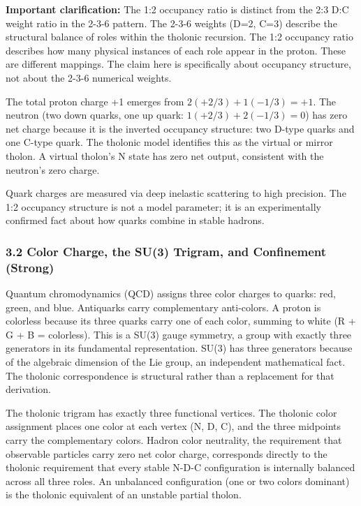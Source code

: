 \documentclass[
  11pt,
  letterpaper,
]{article}
\begin{document}
\textbf{Important clarification:} The 1:2 occupancy ratio is distinct
from the 2:3 D:C weight ratio in the 2-3-6 pattern. The 2-3-6 weights
(D=2, C=3) describe the structural balance of roles within the tholonic
recursion. The 1:2 occupancy ratio describes how many physical instances
of each role appear in the proton. These are different mappings. The
claim here is specifically about occupancy structure, not about the
2-3-6 numerical weights.

The total proton charge +1 emerges from \(2(+2/3) + 1(-1/3) = +1\). The
neutron (two down quarks, one up quark: \(1(+2/3) + 2(-1/3) = 0\)) has
zero net charge because it is the inverted occupancy structure: two
D-type quarks and one C-type quark. The tholonic model identifies this
as the virtual or mirror tholon. A virtual tholon's N state has zero net
output, consistent with the neutron's zero charge.

Quark charges are measured via deep inelastic scattering to high
precision. The 1:2 occupancy structure is not a model parameter; it is
an experimentally confirmed fact about how quarks combine in stable
hadrons.

\subsubsection{3.2 Color Charge, the SU(3) Trigram, and Confinement
(Strong)}\label{color-charge-the-su3-trigram-and-confinement-strong}

Quantum chromodynamics (QCD) assigns three color charges to quarks: red,
green, and blue. Antiquarks carry complementary anti-colors. A proton is
colorless because its three quarks carry one of each color, summing to
white (R + G + B = colorless). This is a SU(3) gauge symmetry, a group
with exactly three generators in its fundamental representation. SU(3)
has three generators because of the algebraic dimension of the Lie
group, an independent mathematical fact. The tholonic correspondence is
structural rather than a replacement for that derivation.

The tholonic trigram has exactly three functional vertices. The tholonic
color assignment places one color at each vertex (N, D, C), and the
three midpoints carry the complementary colors. Hadron color neutrality,
the requirement that observable particles carry zero net color charge,
corresponds directly to the tholonic requirement that every stable N-D-C
configuration is internally balanced across all three roles. An
unbalanced configuration (one or two colors dominant) is the tholonic
equivalent of an unstable partial tholon.
\end{document}
